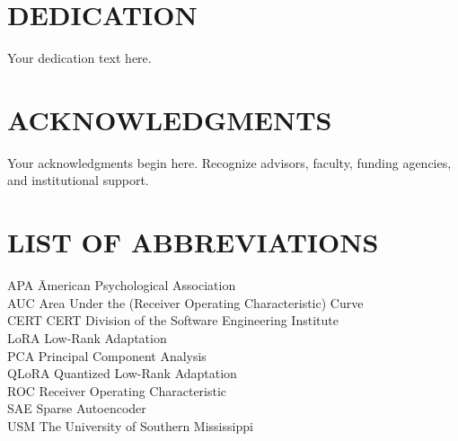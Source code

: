 \documentclass[12pt]{report}
\begin{document}
\chapter*{DEDICATION}

Your dedication text here.

\newpage


\chapter*{ACKNOWLEDGMENTS}

Your acknowledgments begin here. Recognize advisors,
faculty, funding agencies, and institutional support.

\newpage


\tableofcontents
\newpage


\listoftables
\newpage


\listoffigures
\newpage


\chapter*{LIST OF ABBREVIATIONS}

\begin{tabbing}
APA \hspace{1in} \= American Psychological Association \\
AUC \> Area Under the (Receiver Operating Characteristic) Curve \\
CERT \> CERT Division of the Software Engineering Institute \\
LoRA \> Low-Rank Adaptation \\
PCA \> Principal Component Analysis \\
QLoRA \> Quantized Low-Rank Adaptation \\
ROC \> Receiver Operating Characteristic \\
SAE \> Sparse Autoencoder \\
USM \> The University of Southern Mississippi \\
\end{tabbing}
\end{document}
